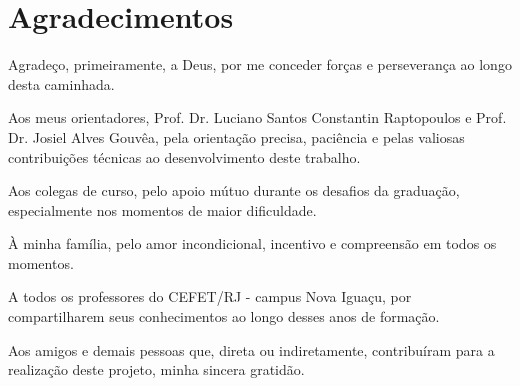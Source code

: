 \chapter*{Agradecimentos}

Agradeço, primeiramente, a Deus, por me conceder forças e perseverança ao longo desta caminhada.

Aos meus orientadores, Prof. Dr. Luciano Santos Constantin Raptopoulos e Prof. Dr. Josiel Alves Gouvêa, pela orientação precisa, paciência e pelas valiosas contribuições técnicas ao desenvolvimento deste trabalho.

Aos colegas de curso, pelo apoio mútuo durante os desafios da graduação, especialmente nos momentos de maior dificuldade.

À minha família, pelo amor incondicional, incentivo e compreensão em todos os momentos.

A todos os professores do CEFET/RJ - campus Nova Iguaçu, por compartilharem seus conhecimentos ao longo desses anos de formação.

Aos amigos e demais pessoas que, direta ou indiretamente, contribuíram para a realização deste projeto, minha sincera gratidão.